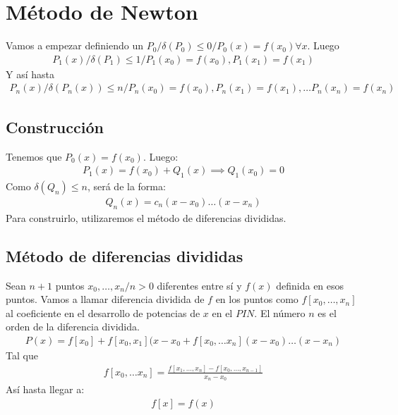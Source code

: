 \documentclass{article}
\begin{document}
\section{Método de Newton}
Vamos a empezar definiendo un $P_{0} / \delta (P_{0}) \leq 0 / P_{0}(x)= f(x_{0}) \forall x$. Luego
\begin{equation}
	\begin{split}
		P_{1}(x) / \delta(P_{1}) \leq 1 / P_{1}(x_{0})=f(x_{0}), P_{1}(x_{1})= f(x_{1})
	\end{split}
\end{equation}
Y así hasta
\begin{equation}
	\begin{split}
		P_{n}(x) / \delta(P_{n}(x)) \leq n / P_{n}(x_{0}) = f(x_{0}),P_{n}(x_{1})=f(x_{1}),\dots P_{n}(x_{n})=f(x_{n})
	\end{split}
\end{equation}
\subsection{Construcción}
Tenemos que $P_{0}(x)=f(x_{0})$. Luego:
\begin{equation}
	\begin{split}
		P_{1}(x)=f(x_{0})+Q_{1}(x) \implies
		Q_{1}(x_{0})=0
	\end{split}
\end{equation}
Como $\delta(Q_{n}) \leq n$, será de la forma:
\begin{equation}
	\begin{split}
		Q_{n}(x)=c_{n}(x-x_{0})\dots (x-x_{n})
	\end{split}
\end{equation}
Para construirlo, utilizaremos el método de diferencias
divididas.
\subsection{Método de diferencias divididas}
Sean $n+1$ puntos $x_{0},\dots ,x_{n} / n > 0$ diferentes entre sí
y $f(x)$ definida en esos puntos. Vamos a llamar diferencia dividida de $f$ en los puntos
como $f[x_{0},\dots ,x_{n}]$ al coeficiente en el desarrollo de
potencias de $x$ en el $PIN$. El número $n$ es el orden de la diferencia dividida.
\begin{equation}
	\begin{split}
		P(x)=f[x_{0}]+f[x_{0},x_{1}](x-x_{0}
		+ f[x_{0},\dots x_{n}](x-x_{0})\dots (x-x_{n})
	\end{split}
\end{equation}
Tal que
\begin{equation}
	\begin{split}
		f[x_{0},\dots x_{n}] =
		\frac{f[x_{1},\dots, x_{n}]-
		f[x_{0},\dots, x_{n-1}]}{x_{n}-x_{0}}
	\end{split}
\end{equation}
Así hasta llegar a:
\begin{equation}
	\begin{split}
		f[x]=f(x)
	\end{split}
\end{equation}
\end{document}

